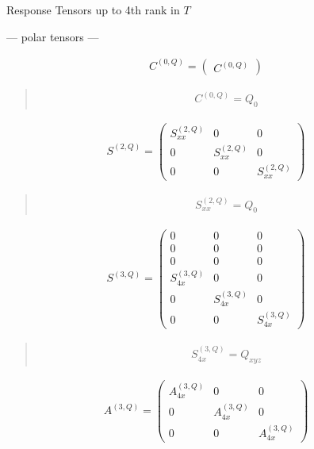 \documentclass[fleqn,10pt]{jsarticle}
\begin{document}
\setcounter{MaxMatrixCols}{16}

\begin{center}
\LARGE
Response Tensors up to 4th rank in $T$
\end{center}
\begin{center}\LARGE --- polar tensors ---\end{center}
\begin{align*}
C^{(0,Q)} = \begin{pmatrix} C^{(0,Q)} \end{pmatrix}
\end{align*}
\begin{quote}
\begin{align*}
& C^{(0,Q)} = Q_{0}
\end{align*}
\end{quote}
\begin{align*}
S^{(2,Q)} = \begin{pmatrix} S^{(2,Q)}_{xx} & 0 & 0 \\ 0 & S^{(2,Q)}_{xx} & 0 \\ 0 & 0 & S^{(2,Q)}_{xx} \end{pmatrix}
\end{align*}
\begin{quote}
\begin{align*}
& S^{(2,Q)}_{xx} = Q_{0}
\end{align*}
\end{quote}
\begin{align*}
S^{(3,Q)} = \begin{pmatrix} 0 & 0 & 0 \\ 0 & 0 & 0 \\ 0 & 0 & 0 \\ S^{(3,Q)}_{4x} & 0 & 0 \\ 0 & S^{(3,Q)}_{4x} & 0 \\ 0 & 0 & S^{(3,Q)}_{4x} \end{pmatrix}
\end{align*}
\begin{quote}
\begin{align*}
& S^{(3,Q)}_{4x} = Q_{xyz}
\end{align*}
\end{quote}
\begin{align*}
A^{(3,Q)} = \begin{pmatrix} A^{(3,Q)}_{4x} & 0 & 0 \\ 0 & A^{(3,Q)}_{4x} & 0 \\ 0 & 0 & A^{(3,Q)}_{4x} \end{pmatrix}
\end{align*}
\end{document}
